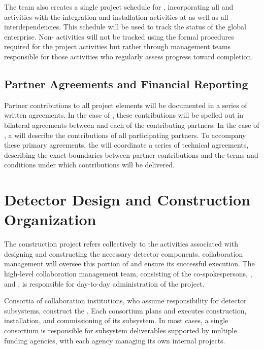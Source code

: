 The  team also creates a single 
project schedule for , incorporating all 
 and  activities with the 
integration and installation activities at  
as well as all interdependencies.  This schedule will 
be used to track the status of the global enterprise.  
  Non- activities 
will not be tracked using the formal  procedures 
required for the  project activities but rather 
through management teams responsible for those activities who regularly assess progress toward completion.  


\subsection{Partner Agreements and Financial Reporting}
\label{sec:dune_agreements}

Partner contributions to all project elements will be documented %
in a series of written agreements.  In the case of , 
these contributions will be spelled out in bilateral agreements 
between  and each of the contributing partners.  In 
the case of , a  will describe  
the contributions of all participating partners. %
 To accompany these primary agreements, the   will coordinate a series of technical agreements, describing the exact 
boundaries between partner contributions and the terms and 
conditions under which contributions will be delivered. 

\section{Detector Design and Construction Organization}
\label{sec:es-tc-det-const}

The   construction project refers collectively 
to the activities associated with designing and constructing the
necessary detector components.   collaboration management 
will oversee this portion of  and 
ensure its successful execution.  The high-level  
collaboration management team, consisting of the co-spokespersons, 
, and , is responsible for day-to-day 
administration of the project.  

Consortia of collaboration institutions, who assume responsibility 
for detector subsystems, construct the  . Each consortium plans and executes 
construction, installation, and commissioning of its subsystem.  In most cases, a single consortium is responsible for subsystem deliverables supported by 
multiple funding agencies, with each agency managing its own internal projects. 

